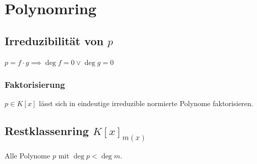 \section*{Polynomring}

\subsection*{Irreduzibilität von $p$}
$p = f \cdot g \implies \deg f=0 \lor \deg g = 0$

\subsubsection*{Faktorisierung}
$p \in K[x]$ lässt sich in eindeutige irreduzible normierte Polynome faktorisieren.

\subsection*{Restklassenring $K[x]_{m(x)}$}
Alle Polynome $p$ mit $\deg p < \deg m$.
